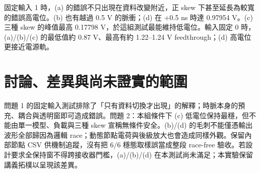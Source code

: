 固定輸入 1 時，(a) 的錯誤不只出現在資料改變附近，正 skew 下甚至延長為較寬的錯誤高電位。(b) 也有越過 0.5 V 的脈衝；(d) 在 +0.5 ns 時達 0.97954 V。(c) 三種 skew 的峰值最高 0.17798 V，於這組測試最能維持低電位。輸入固定 0 時，(a)/(b)/(c) 的最低值約 0.87 V、最高有約 1.22--1.24 V feedthrough；(d) 高電位更接近電源軌。

\section{討論、差異與尚未證實的範圍}

問題 1 的固定輸入測試排除了「只有資料切換才出現」的解釋；時脈本身的預充、耦合與透明窗即可造成錯誤。問題 2：本組條件下 (c) 低電位保持最穩，但不能由單一模型、負載與三種 skew 宣稱無條件安全。(b)/(d) 的毛刺不能僅憑輸出波形全部歸因為邏輯 race；動態節點電荷與後級放大也會造成同樣外觀。保留內部節點 CSV 供機制追蹤，沒有把 6/6 穩態取樣誤當成整段 race-free 驗收。若設計要求全保持窗不得跨接收器門檻，(a)/(b)/(d) 在本測試尚未滿足；本實驗保留講義拓樸以呈現該差異。
